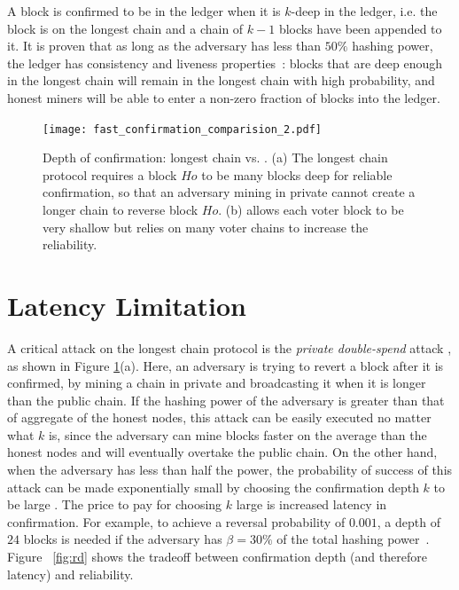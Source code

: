  A block is confirmed to be in the ledger when it is $k$-deep in the ledger, i.e. the block is on the longest chain and a chain of $k-1$ blocks have been appended to it. It is proven that as long as the adversary has less than $50\%$ hashing power, the ledger has consistency and liveness properties~\cite{backbone}: blocks that are deep enough in the longest chain will remain in the longest chain with high probability, and honest miners will be able to enter a non-zero fraction of blocks into the ledger. 

\begin{figure}
\begin{center}
\texttt{[image: fast\_confirmation\_comparision\_2.pdf]}
\end{center}
    \caption[Depth of confirmation: longest chain vs. Prism.]{Depth of confirmation: longest chain vs. \prism. (a) The longest chain protocol requires a block $Ho$ to be many blocks deep for reliable confirmation, so that an adversary mining in private cannot create a longer chain to reverse block $Ho$. (b) \prism allows each voter block to be very shallow but relies on many voter chains to increase the reliability.}
\label{fig:double_spend}
\end{figure}

\section{Latency Limitation}
\label{s:lc-latency}
A critical attack on the longest chain protocol is the {\em private  double-spend} attack \cite{bitcoin}, as shown in Figure \ref{fig:double_spend}(a). Here, an adversary is trying to revert a block after it is confirmed, by mining a chain in private and broadcasting it when it is longer than the public chain. If the hashing power of the adversary is greater than that of aggregate of the honest nodes, this attack can be easily executed no matter what $k$ is, since the adversary can mine blocks faster on the average than the honest nodes and will eventually  overtake the public chain. On the other hand, when the adversary has less than half the power, the probability of success of this attack can be made exponentially small by choosing the confirmation depth $k$ to be large \cite{bitcoin}. The price to pay for choosing $k$ large is increased latency in confirmation. For example, to achieve a reversal probability of  $0.001$, a depth of $24$ blocks is needed if the adversary has $\beta = 30\%$ of the total hashing power~\cite{bitcoin}.  Figure ~\ref{fig:rd} shows the tradeoff between confirmation depth (and therefore latency) and reliability.


